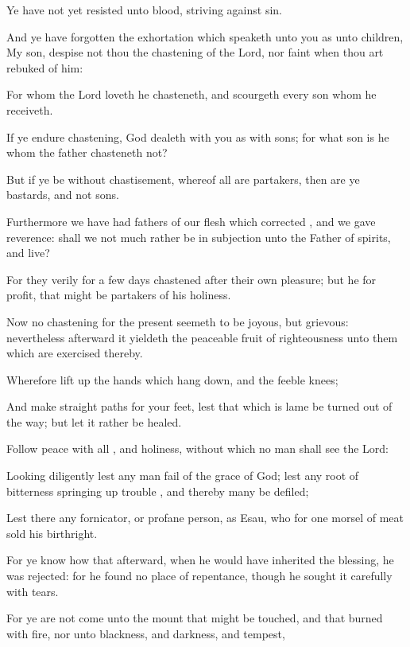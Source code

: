 {Ye
have not
yet
resisted
unto
blood,
striving
against
sin.

And ye have
forgotten the
exhortation
which
speaketh unto
you
as unto
children,
My
son,
despise
not
thou the
chastening of the
Lord,
nor
faint when thou art
rebuked
of
him:

For
whom the
Lord
loveth he
chasteneth,
and
scourgeth
every
son
whom he
receiveth.

If ye
endure
chastening,
God
dealeth with
you
as with
sons;
for
what
son is
he
whom the
father
chasteneth
not?

But
if ye
be
without
chastisement,
whereof
all
are
partakers,
then are
ye
bastards,
and
not
sons.

Furthermore we have
had
fathers
of
our
flesh which
corrected
{},
and we
gave
{}
reverence: shall
we
not
much
rather be in subjection
unto the
Father of
spirits,
and
live?

For
they
verily
for a
few
days
chastened
{}
after their
own
pleasure;
but
he
for
{}
profit,
that
{} might be
partakers
of
his
holiness.

Now
no
chastening
for the
present
seemeth to
be
joyous,
but
grievous:
nevertheless
afterward it
yieldeth
the
peaceable
fruit of
righteousness unto them which are
exercised
thereby.

Wherefore lift
up the
hands which hang
down,
and
the
feeble
knees;

And
make
straight
paths
for
your
feet,
lest that which is
lame be turned out of the
way;
but let
it
rather be
healed.

Follow
peace
with
all
{},
and
holiness,
without
which no
man shall
see the
Lord:

Looking
diligently
lest any
man
fail
of the
grace of
God;
lest
any
root of
bitterness
springing
up
trouble
{},
and
thereby
many be
defiled;

Lest
there
{}
any
fornicator,
or profane
person,
as
Esau,
who
for
one morsel of
meat
sold
his
birthright.

For ye
know how
that
afterward, when he would
have
inherited the
blessing, he was
rejected:
for he
found
no
place of
repentance,
though he
sought
it
carefully
with
tears.

For ye
are
not come
unto the
mount that might be
touched,
and that
burned with
fire,
nor unto
blackness,
and
darkness,
and
tempest,

}
